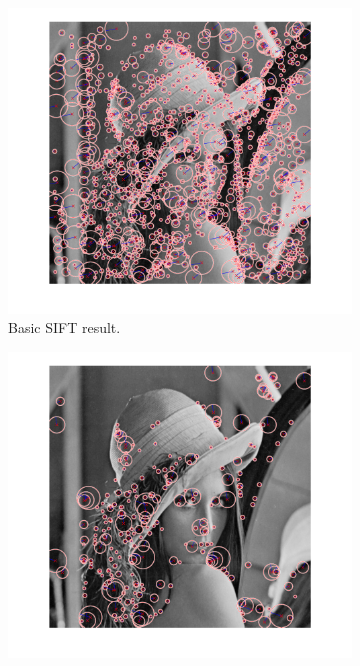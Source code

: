 \documentclass[12pt]{article}
\begin{document}
\begin{figure}[htbp!]
        \centering
        \begin{subfigure}[b]{0.49\textwidth}
                \includegraphics[width=\textwidth]{images/sift2}
                \caption{Basic SIFT result.}
                \label{fig:sift1}
        \end{subfigure}
        \begin{subfigure}[b]{0.49\textwidth}
                \includegraphics[width=\textwidth]{images/sift1}

\end{subfigure}
\end{figure}
\end{document}
